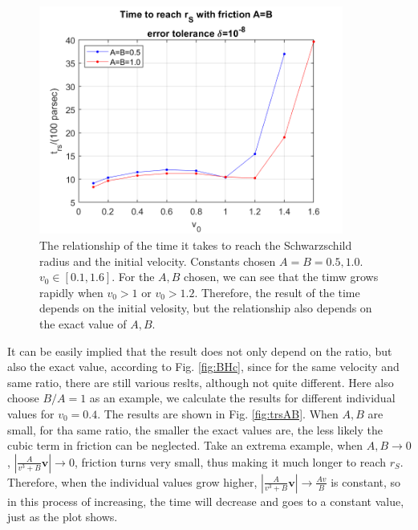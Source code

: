 \documentclass[12pt, graphicx]{article}
\begin{document}
\begin{figure}[ht]
\centering
\includegraphics[width = 100mm]{trs_v.png}
\caption{The relationship of the time it takes to reach the Schwarzschild radius and the initial velocity. Constants chosen $A=B=0.5, 1.0$. $v_0\in [0.1, 1.6]$. For the $A, B$ chosen, we can see that the timw grows rapidly when $v_0>1$ or $v_0>1.2$. Therefore, the result of the time depends on the initial velosity, but the relationship also depends on the exact value of $A, B$.}
\label{fig:trsv}
\end{figure}

It can be easily implied that the result does not only depend on the ratio, but also the exact value, according to Fig. \ref{fig:BHc}, since for the same velocity and same ratio, there are still various reslts, although not quite different. Here also choose $B/A=1$ as an example, we calculate the results for different individual values for $v_0=0.4$. The results are shown in Fig. \ref{fig:trsAB}. When $A, B$ are small, for tha same ratio, the smaller the exact values are, the less likely the cubic term in friction can be neglected. Take an extrema example, when $A, B\to 0$, $|\frac{A}{v^3+B}\mathbf{v}|\to 0$, friction turns very small, thus making it much longer to reach $r_S$. Therefore, when the individual values grow higher, $|\frac{A}{v^3+B}\mathbf{v}|\to \frac{Av}{B}$ is constant, so in this process of increasing, the time will decrease and goes to a constant value, just as the plot shows.
\end{document}
